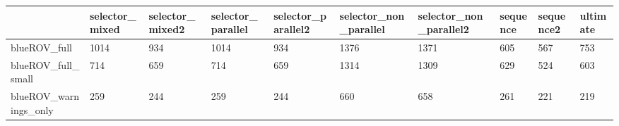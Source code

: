 \begin{tabular}{llllllllll}
\toprule
{} & selector\_mixed & selector\_mixed2 & selector\_parallel & selector\_parallel2 & selector\_non\_parallel & selector\_non\_parallel2 & sequence & sequence2 & ultimate \\
\midrule
blueROV\_full          &           1014 &             934 &              1014 &                934 &                  1376 &                   1371 &      605 &       567 &      753 \\
blueROV\_full\_small    &            714 &             659 &               714 &                659 &                  1314 &                   1309 &      629 &       524 &      603 \\
blueROV\_warnings\_only &            259 &             244 &               259 &                244 &                   660 &                    658 &      261 &       221 &      219 \\
\bottomrule
\end{tabular}
